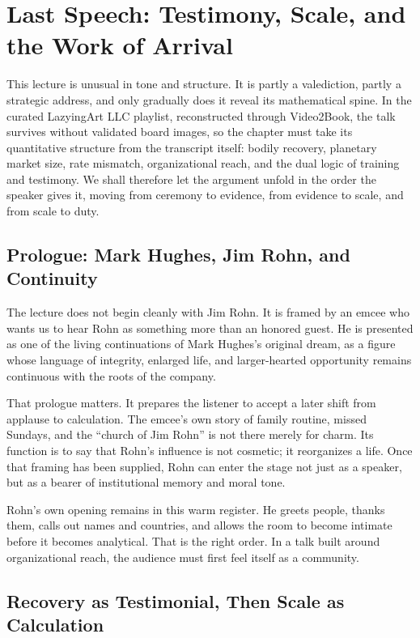 \chapter{Last Speech: Testimony, Scale, and the Work of Arrival}

This lecture is unusual in tone and structure. It is partly a valediction, partly a strategic address, and only gradually does it reveal its mathematical spine. In the curated LazyingArt LLC playlist, reconstructed through Video2Book, the talk survives without validated board images, so the chapter must take its quantitative structure from the transcript itself: bodily recovery, planetary market size, rate mismatch, organizational reach, and the dual logic of training and testimony. We shall therefore let the argument unfold in the order the speaker gives it, moving from ceremony to evidence, from evidence to scale, and from scale to duty.

\section{Prologue: Mark Hughes, Jim Rohn, and Continuity}

The lecture does not begin cleanly with Jim Rohn. It is framed by an emcee who wants us to hear Rohn as something more than an honored guest. He is presented as one of the living continuations of Mark Hughes's original dream, as a figure whose language of integrity, enlarged life, and larger-hearted opportunity remains continuous with the roots of the company.

That prologue matters. It prepares the listener to accept a later shift from applause to calculation. The emcee's own story of family routine, missed Sundays, and the ``church of Jim Rohn'' is not there merely for charm. Its function is to say that Rohn's influence is not cosmetic; it reorganizes a life. Once that framing has been supplied, Rohn can enter the stage not just as a speaker, but as a bearer of institutional memory and moral tone.

Rohn's own opening remains in this warm register. He greets people, thanks them, calls out names and countries, and allows the room to become intimate before it becomes analytical. That is the right order. In a talk built around organizational reach, the audience must first feel itself as a community.

\section{Recovery as Testimonial, Then Scale as Calculation}

